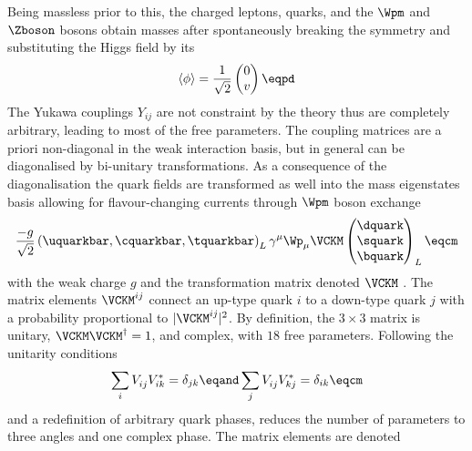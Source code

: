 Being massless prior to this, the charged leptons, quarks, and the $\Wpm$ and
$\Zboson$ bosons obtain masses after spontaneously breaking the symmetry and
substituting the Higgs field by its \VEV
%
\begin{equation}\label{sec:cpv_theory:flavour_physics:ckm_matrix:higgs_vev}
  \langle\phi\rangle = \frac{1}{\sqrt{2}} \begin{pmatrix}
    0 \\
    v \\
  \end{pmatrix}\eqpd
\end{equation}
%
The Yukawa couplings $Y_{ij}$ are not constraint by the theory thus are
completely arbitrary, leading to most of the free \SM parameters. The coupling
matrices are a priori non-diagonal in the weak interaction basis, but in general
can be diagonalised by bi-unitary transformations. As a consequence of the
diagonalisation the quark fields are transformed as well into the mass
eigenstates basis allowing for flavour-changing currents through $\Wpm$ boson
exchange
%
\begin{equation}
  \frac{-g}{\sqrt{2}} \left( \uquarkbar, \cquarkbar, \tquarkbar \right)_L \gamma^\mu \Wp_\mu \VCKM 
  \begin{pmatrix}
    \dquark \\
    \squark \\
    \bquark \\
  \end{pmatrix}_L \eqcm
\end{equation}
%
with the weak charge $g$ and the transformation matrix denoted $\VCKM$
\cite{Cabibbo:1963yz,Kobayashi:1973fv}. The \CKM matrix elements $\VCKM^{ij}$
connect an up-type quark $i$ to a down-type quark $j$ with a probability
proportional to $\vert\VCKM^{ij}\vert^2$. By definition, the $3 \times 3$ \CKM
matrix is unitary, $\VCKM\VCKM^\dagger=1$, and complex, with $\num{18}$ free
parameters. Following the unitarity conditions
%
\begin{equation}\label{sec:cpv_theory:flavour_physics:ckm_matrix:unitarity_relations}
  \sum_i V_{ij}^{\phantom{\ast}} V_{ik}^{\ast} = \delta_{jk} \eqand
  \sum_j V_{ij}^{\phantom{\ast}} V_{kj}^{\ast} = \delta_{ik} \eqcm
\end{equation}
%
and a redefinition of arbitrary quark phases, reduces the number of parameters
to three angles and one complex phase. The matrix elements are denoted
%
